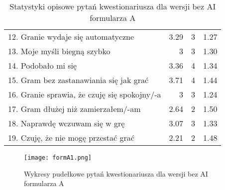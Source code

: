 \begin{table}[h!]
\begin{center}
\begin{tabular}{|m{12em}|r|r|r|}
            12. Granie wydaje się automatyczne                                & 3.29          & 3       & 1.27           \\
            13. Moje myśli \newline biegną szybko                             & 3             & 3       & 1.30           \\
            14. Podobało mi się                                               & 3.36          & 4       & 1.34           \\
            15. Gram bez zastanawiania się jak grać                           & 3.71          & 4       & 1.44           \\
            16. Granie sprawia, \newline że czuję się spokojny/-a             & 3             & 3       & 1.24           \\
            17. Gram dłużej \newline niż zamierzałem/-am                      & 2.64          & 2       & 1.50           \\
            18. Naprawdę wczuwam się w grę                                    & 3.07          & 3       & 1.33           \\
            19. Czuję, że nie mogę przestać grać                              & 2.21          & 2       & 1.48           \\
            \hline
        \end{tabular}
    \end{center}
    \caption{Statystyki opisowe pytań kwestionariusza dla wersji bez AI formularza A}\label{tab1:appendixB_6}
\end{table}

\begin{figure}[h!]
    \centering
    \texttt{[image: formA1.png]}
    \caption{Wykresy pudełkowe pytań kwestionariusza dla wersji bez AI formularza A}
    \label{fig:appendixB_formA1}
\end{figure}

